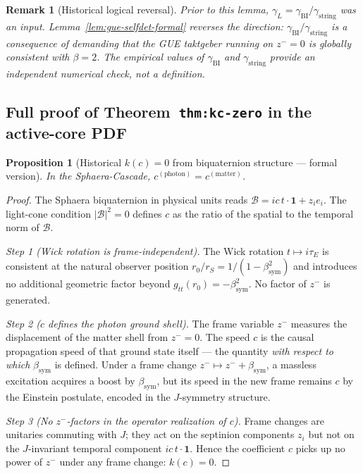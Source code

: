 \documentclass[12pt,a4paper]{article}
\newtheorem{proposition}[theorem]{Proposition}
\newtheorem{remark}[theorem]{Remark}
\newcommand{\bsym}{\beta_{\mathrm{sym}}}
\newcommand{\gL}{\gamma_L}
\newcommand{\gstring}{\gamma_{\mathrm{string}}}
\newcommand{\gBI}{\gamma_{\mathrm{BI}}}
\newcommand{\zminus}{z^-}
\begin{document}
\begin{remark}[Historical logical reversal]
Prior to this lemma, $\gL=\gBI/\gstring$ was an \emph{input}.
Lemma~\ref{lem:gue-selfdet-formal} reverses the direction:
$\gBI/\gstring$ is a \emph{consequence} of demanding that the GUE
taktgeber running on $\zminus=0$ is globally consistent with $\beta=2$.
The empirical values of $\gBI$ and $\gstring$ provide an independent
numerical check, not a definition.
\end{remark}

\subsection*{Full proof of Theorem~\texttt{thm:kc-zero} in the active-core PDF}
\label{app:kc-zero}

\begin{proposition}[Historical $k(c)=0$ from biquaternion structure --- formal version]
In the Sphaera-Cascade, $c^{(\mathrm{photon})}=c^{(\mathrm{matter})}$.
\end{proposition}

\begin{proof}
The Sphaera biquaternion in physical units reads
$\mathcal{B} = ic\,t\cdot\mathbf{1}+z_i e_i$.
The light-cone condition $|\mathcal{B}|^2=0$ defines $c$ as the ratio
of the spatial to the temporal norm of $\mathcal{B}$.

\emph{Step 1 (Wick rotation is frame-independent).}
The Wick rotation $t\mapsto i\tau_E$ is consistent at the natural
observer position $r_0/r_S=1/(1-\bsym^2)$ and introduces no additional
geometric factor beyond $g_{tt}(r_0)=-\bsym^2$.
No factor of $\zminus$ is generated.

\emph{Step 2 ($c$ defines the photon ground shell).}
The frame variable $\zminus$ measures the displacement of the matter
shell from $\zminus=0$.
The speed $c$ is the causal propagation speed of that ground state
itself --- the quantity \emph{with respect to which} $\bsym$ is defined.
Under a frame change $\zminus\mapsto\zminus+\bsym$, a massless excitation
acquires a boost by $\bsym$, but its speed in the new frame remains $c$
by the Einstein postulate, encoded in the $J$-symmetry structure.

\emph{Step 3 (No $\zminus$-factors in the operator realization of $c$).}
Frame changes are unitaries commuting with $J$; they act on the septinion
components $z_i$ but not on the $J$-invariant temporal component
$ic\,t\cdot\mathbf{1}$.
Hence the coefficient $c$ picks up no power of $\zminus$ under any
frame change: $k(c)=0$.
\end{proof}
\end{document}
